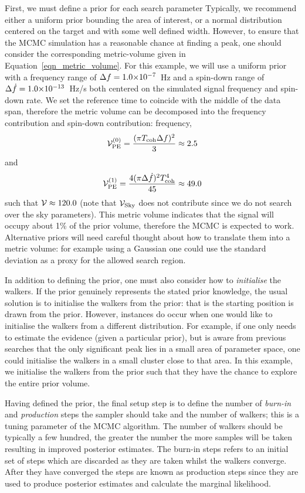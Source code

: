 \documentclass[aps, prd, twocolumn, superscriptaddress, floatfix, showpacs, nofootinbib, longbibliography]{revtex4-1}
\begin{document}
First, we must define a prior for each search parameter Typically, we recommend
either a uniform prior bounding the area of interest, or a normal distribution
centered on the target and with some well defined width. However, to ensure
that the MCMC simulation has a reasonable chance at finding a peak, one should
consider the corresponding metric-volume given in
Equation~\eqref{eqn_metric_volume}. For this example, we will use a uniform
prior with a frequency range of $\Delta f=1.0{\times}10^{-7}$~Hz and a
spin-down range of $\Delta \dot{f}=1.0{\times}10^{-13}$~Hz/s both centered on
the simulated signal frequency and spin-down rate. We set the reference time to
coincide with the middle of the data span, therefore the metric volume can be
decomposed into the frequency contribution and spin-down contribution:
frequency,
\begin{align}
\mathcal{V}_{\rm PE}^{(0)} = \frac{(\pi T_{\rm coh}\Delta f)^2}{3} \approx 2.5
\end{align}
and
\begin{align}
\mathcal{V}_{\rm PE}^{(1)} = \frac{4(\pi\Delta \dot{f})^2T_{\rm coh}^{4}}{45} \approx 49.0
\end{align}
such that $\mathcal{V}\approx120.0$ (note that $\mathcal{V}_{\rm Sky}$ does not contribute
since we do not search over the sky parameters). This metric volume indicates
that the signal will occupy about 1\% of the prior volume, therefore the MCMC
is expected to work. Alternative priors will need careful thought about how to
translate them into a metric volume: for example using a Gaussian one could use
the standard deviation as a proxy for the allowed search region.

In addition to defining the prior, one must also consider how to
\emph{initialise} the walkers. If the prior genuinely represents the stated
prior knowledge, the usual solution is to initialise the walkers from the
prior: that is the starting position is drawn from the prior. However,
instances do occur when one would like to initialise the walkers from a
different distribution. For example, if one only needs to estimate the evidence
(given a particular prior), but is aware from previous searches that the only
significant peak lies in a small area of parameter space, one could initialise
the walkers in a small cluster close to that area. In this example, we
initialise the walkers from the prior such that they have the chance to explore
the entire prior volume.

Having defined the prior, the final setup step is to define the number of
\emph{burn-in} and \emph{production} steps the sampler should take and the
number of walkers; this is a tuning parameter of the MCMC algorithm. The number
of walkers should be typically a few hundred, the greater the number the more
samples will be taken resulting in improved posterior estimates. The burn-in
steps refers to an initial set of steps which are discarded as they are taken
whilst the walkers converge. After they have converged the steps are known as
production steps since they are used to produce posterior estimates and
calculate the marginal likelihood.
\end{document}
